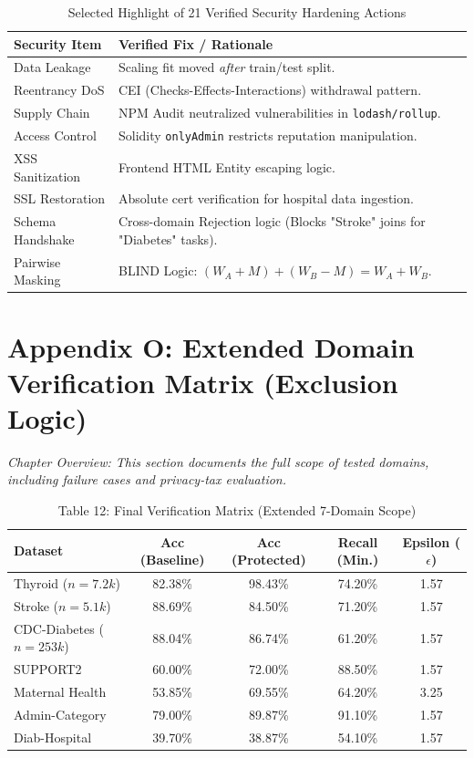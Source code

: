 \documentclass[10pt, a4paper, twocolumn]{article}
\begin{document}
\begin{table}[hbt!]
    \centering
    \begin{tabular}{@{}lp{10cm}@{}}
        \toprule
        \textbf{Security Item} & \textbf{Verified Fix / Rationale} \\ \midrule
        Data Leakage & Scaling fit moved \textit{after} train/test split. \\
        Reentrancy DoS & CEI (Checks-Effects-Interactions) withdrawal pattern. \\
        Supply Chain & NPM Audit neutralized vulnerabilities in \texttt{lodash/rollup}. \\
        Access Control & Solidity \texttt{onlyAdmin} restricts reputation manipulation. \\
        XSS Sanitization & Frontend HTML Entity escaping logic. \\
        SSL Restoration & Absolute cert verification for hospital data ingestion. \\
        Schema Handshake & Cross-domain Rejection logic (Blocks "Stroke" joins for "Diabetes" tasks). \\
        Pairwise Masking & BLIND Logic: $(W_A + M) + (W_B - M) = W_A + W_B$. \\ \bottomrule
    \end{tabular}
    \caption*{Selected Highlight of 21 Verified Security Hardening Actions}
\end{table}

\section*{Appendix O: Extended Domain Verification Matrix (Exclusion Logic)}
\textit{Chapter Overview: This section documents the full scope of tested domains, including failure cases and privacy-tax evaluation.}

\begin{table}[hbt!]
\centering
\begin{tabular}{lcccc}
\toprule
\textbf{Dataset} & \textbf{Acc (Baseline)} & \textbf{Acc (Protected)} & \textbf{Recall (Min.)} & \textbf{Epsilon ($\epsilon$)} \\ \midrule
Thyroid ($n=7.2k$) & 82.38\% & 98.43\% & 74.20\% & 1.57 \\
Stroke ($n=5.1k$) & 88.69\% & 84.50\% & 71.20\% & 1.57 \\
CDC-Diabetes ($n=253k$) & 88.04\% & 86.74\% & 61.20\% & 1.57 \\
SUPPORT2 & 60.00\% & 72.00\% & 88.50\% & 1.57 \\
Maternal Health & 53.85\% & 69.55\% & 64.20\% & 3.25 \\
Admin-Category & 79.00\% & 89.87\% & 91.10\% & 1.57 \\
Diab-Hospital & 39.70\% & 38.87\% & 54.10\% & 1.57 \\ \bottomrule
\end{tabular}
\caption{Table 12: Final Verification Matrix (Extended 7-Domain Scope)}
\end{table}
\end{document}
